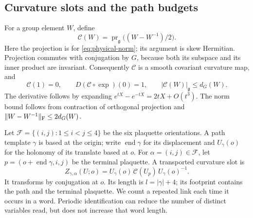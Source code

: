 \documentclass[11pt,reqno]{amsart}
\numberwithin{equation}{section}
\theoremstyle{definition}
\theoremstyle{remark}
\newcommand{\g}{\mathfrak g}
\begin{document}
\subsection{Curvature slots and the path budgets}

For a group element \(W\), define
\begin{equation}
       \mathcal C(W)=\operatorname{pr}_{\g}
                                      \bigl((W-W^{-1})/2\bigr).
 \label{eq:principal-curvature}
\end{equation}
Here the projection is for \eqref{eq:physical-norm}; its argument
is skew Hermitian. Projection commutes with conjugation by \(G\),
because both its subspace and its inner product are invariant.
Consequently \(\mathcal C\) is a smooth covariant curvature map,
and
\begin{equation}
 \mathcal C(1)=0,\qquad
 D(\mathcal C\circ\exp)(0)=1,\qquad
 |\mathcal C(W)|_{\g}\le d_G(W).
 \label{eq:curvature-properties}
\end{equation}
The derivative follows by expanding \(e^{tX}-e^{-tX}=2tX+O(t^3)\).
The norm bound follows from contraction of orthogonal projection
and \(\|W-W^{-1}\|_{\rm F}\le2d_G(W)\).

Let \(\mathcal F=\{(i,j):1\le i<j\le4\}\) be the six plaquette
orientations. A path template \(\gamma\) is based at the origin;
write \(\operatorname{end}\gamma\) for its displacement and
\(U_\gamma(o)\) for the holonomy of its translate based at \(o\).
For \(\alpha=(i,j)\in\mathcal F\), let
\(p=(o+\operatorname{end}\gamma,i,j)\) be the terminal plaquette.
A transported curvature slot is
\begin{equation}
 Z_{\gamma,\alpha}(U;o)
   =U_\gamma(o)\,\mathcal C(U_p)\,U_\gamma(o)^{-1}.
 \label{eq:principal-slot}
\end{equation}
It transforms by conjugation at \(o\). Its length is
\(l=|\gamma|+4\); its footprint contains the path and the
terminal plaquette. We count a repeated link each time it occurs
in a word. Periodic identification can reduce the number of
distinct variables read, but does not increase that word length.
\end{document}
